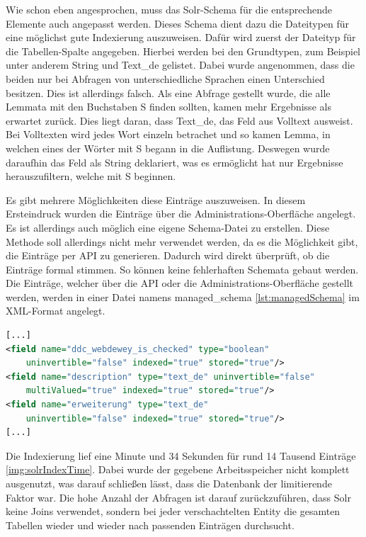 Wie schon eben angesprochen, muss das Solr-Schema für die entsprechende Elemente auch angepasst werden. Dieses Schema dient dazu die Dateitypen für eine möglichst gute Indexierung auszuweisen. Dafür wird zuerst der Dateityp für die Tabellen-Spalte angegeben. Hierbei werden bei den Grundtypen, zum Beispiel unter anderem String und Text\_de gelistet. Dabei wurde angenommen, dass die beiden nur bei Abfragen von unterschiedliche Sprachen einen Unterschied besitzen. Dies ist allerdings falsch. Als eine Abfrage gestellt wurde, die alle Lemmata mit den Buchstaben S finden sollten, kamen mehr Ergebnisse als erwartet zurück. Dies liegt daran, dass Text\_de, das Feld aus Volltext ausweist. 
Bei Volltexten wird jedes Wort einzeln betrachet und so kamen Lemma, in welchen eines der Wörter mit S begann in die Auflistung. Deswegen wurde daraufhin das Feld als String deklariert, was es ermöglicht hat nur Ergebnisse herauszufiltern, welche mit S beginnen.

Es gibt mehrere Möglichkeiten diese Einträge auszuweisen. In diesem Ersteindruck wurden die Einträge über die Administrations-Oberfläche angelegt. Es ist allerdings auch möglich eine eigene Schema-Datei zu erstellen. Diese Methode soll allerdings nicht mehr verwendet werden, da es die Möglichkeit gibt, die Einträge per API zu generieren. Dadurch wird direkt überprüft, ob die Einträge formal stimmen. So können keine fehlerhaften Schemata gebaut werden. Die Einträge, welcher über die API oder die Administrations-Oberfläche gestellt werden, werden in einer Datei namens managed\_schema \ref{lst:managedSchema} im XML-Format angelegt.


\begin{lstlisting}[language=xml, frame=single, label={lst:managedSchema}, 
    morekeywords={type,uninvertible,indexed,stored,field,multiValued, name}] 
[...]
<field name="ddc_webdewey_is_checked" type="boolean" 
    uninvertible="false" indexed="true" stored="true"/>
<field name="description" type="text_de" uninvertible="false" 
    multiValued="true" indexed="true" stored="true"/>
<field name="erweiterung" type="text_de" 
    uninvertible="false" indexed="true" stored="true"/>
[...]
\end{lstlisting}

Die Indexierung lief eine Minute und 34 Sekunden für rund 14 Tausend Einträge \ref{img:solrIndexTime}. Dabei wurde der gegebene Arbeitsspeicher nicht komplett ausgenutzt, was darauf schließen lässt, dass die Datenbank der limitierende Faktor war. Die hohe Anzahl der Abfragen ist darauf zurückzuführen, dass Solr keine Joins verwendet, sondern bei jeder verschachtelten Entity die gesamten Tabellen wieder und wieder nach passenden Einträgen durchsucht.

